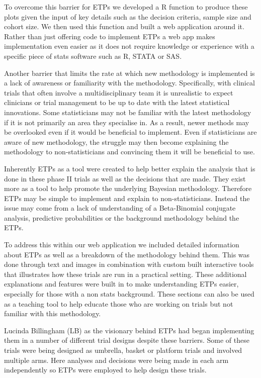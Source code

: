 To overcome this barrier for ETPs we developed a R function to produce these plots given the input of key details such as the decision criteria, sample size and cohort size. We then used this function and built a web application around it. Rather than just offering code to implement ETPs a web app makes implementation even easier as it does not require knowledge or experience with a specific piece of stats software such as R, STATA or SAS. 

Another barrier that limits the rate at which new methodology is implemented is a lack of awareness or familiarity with the methodology. Specifically, with clinical trials that often involve a multidisciplinary team it is unrealistic to expect clinicians or trial management to be up to date with the latest statistical innovations. Some statisticians may not be familiar with the latest methodology if it is not primarily an area they specialise in. As a result, newer methods may be overlooked even if it would be beneficial to implement. Even if statisticians are aware of new methodology, the struggle may then become explaining the methodology to non-statisticians and convincing them it will be beneficial to use. 

Inherently ETPs as a tool were created to help better explain the analysis that is done in these phase \RN{2} trials as well as the decisions that are made. They exist more as a tool to help promote the underlying Bayesian methodology. Therefore ETPs may be simple to implement and explain to non-statisticians. Instead the issue may come from a lack of understanding of a Beta-Binomial conjugate analysis, predictive probabilities or the background methodology behind the ETPs. 

To address this within our web application we included detailed information about ETPs as well as a breakdown of the methodology behind them. This was done through text and images in combination with custom built interactive tools that illustrates how these trials are run in a practical setting. These additional explanations and features were built in to make understanding ETPs easier, especially for those with a non stats background. These sections can also be used as a teaching tool to help educate those who are working on trials but not familiar with this methodology.  

Lucinda Billingham (LB) as the visionary behind ETPs had began implementing them in a number of different trial designs despite these barriers. Some of these trials were being designed as umbrella, basket or platform trials and involved multiple arms. Here analyses and decisions were being made in each arm independently so ETPs were employed to help design these trials. 

